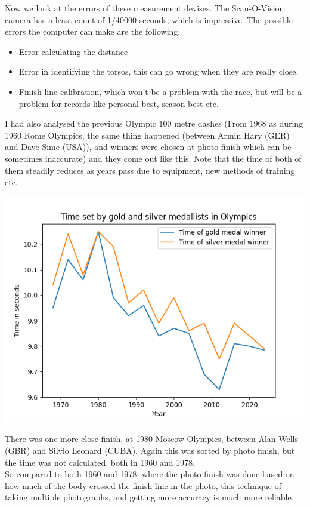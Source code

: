 \documentclass[11pt,a4paper]{article}
\begin{document}
Now we look at the errors of these measurement devises. The Scan-O-Vision camera has a least count of 1/40000 seconds, which is impressive. 
The possible errors the computer can make are the following.
\begin{itemize}
	\item  Error calculating the distance
	\item Error in identifying the torsos, this can go wrong when they are really close.
	\item Finish line calibration, which won't be a problem with the race, but will be a problem for records like personal best, season best etc.
\end{itemize}
I had also analysed the previous Olympic 100 metre dashes (From 1968 as during 1960 Rome Olympics, the same thing happened (between Armin Hary (GER) and Dave Sime (USA)), and winners were chosen at photo finish which can be sometimes inaccurate) and they come out like this. Note that the time of both of them steadily reduces as years pass due to equipment, new methods of training etc.
\begin{center}
	\includegraphics{time.png}
\end{center}

There was one more close finish, at 1980 Moscow Olympics, between Alan Wells (GBR) and Silvio Leonard (CUBA). Again this was sorted by photo finish, but the time was not calculated, both in 1960 and 1978.\\

So compared to both 1960 and 1978, where the photo finish was done based on how much of the body crossed the finish line in the photo, this technique of taking multiple photographs, and getting more accuracy is much more reliable.
\end{document}
